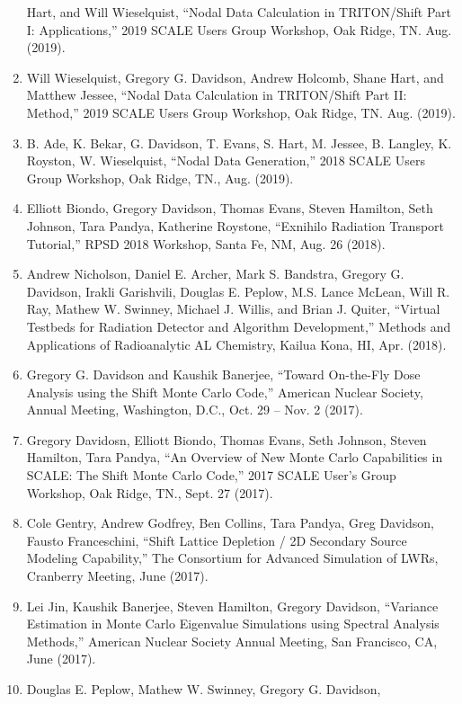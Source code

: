 \documentclass[letterpaper,11pt]{article}
\begin{document}
\begin{enumerate}
    Hart, and Will Wieselquist, ``Nodal Data Calculation in
    TRITON/Shift Part I: Applications,'' 2019 SCALE Users Group
    Workshop, Oak Ridge, TN. Aug. (2019).
  \item Will Wieselquist, Gregory G. Davidson, Andrew Holcomb, Shane
    Hart, and Matthew Jessee, ``Nodal Data Calculation in
    TRITON/Shift Part II: Method,'' 2019 SCALE Users Group Workshop,
    Oak Ridge, TN. Aug. (2019).
  \item B. Ade, K. Bekar, G. Davidson, T. Evans, S. Hart, M. Jessee,
    B. Langley, K. Royston, W. Wieselquist, ``Nodal Data
    Generation,'' 2018 SCALE Users Group Workshop, Oak Ridge, TN.,
    Aug. (2019).
  \item Elliott Biondo, Gregory Davidson, Thomas Evans, Steven
    Hamilton, Seth Johnson, Tara Pandya, Katherine Roystone,
    ``Exnihilo Radiation Transport Tutorial,'' RPSD 2018 Workshop,
    Santa Fe, NM, Aug. 26 (2018).
  \item Andrew Nicholson, Daniel E. Archer, Mark S. Bandstra,
    Gregory G. Davidson, Irakli Garishvili, Douglas E. Peplow,
    M.S. Lance McLean, Will R. Ray, Mathew W. Swinney, Michael
    J. Willis, and Brian J. Quiter, ``Virtual Testbeds for Radiation
    Detector and Algorithm Development,'' Methods and Applications
    of Radioanalytic AL Chemistry, Kailua Kona, HI, Apr. (2018).
  \item Gregory G. Davidson and Kaushik Banerjee, ``Toward
    On-the-Fly Dose Analysis using the Shift Monte Carlo Code,''
    American Nuclear Society, Annual Meeting, Washington, D.C.,
    Oct. 29 -- Nov. 2 (2017).
  \item Gregory Davidosn, Elliott Biondo, Thomas Evans, Seth
    Johnson, Steven Hamilton, Tara Pandya, ``An Overview of New
    Monte Carlo Capabilities in SCALE: The Shift Monte Carlo Code,''
    2017 SCALE User's Group Workshop, Oak Ridge, TN., Sept. 27 (2017).
  \item Cole Gentry, Andrew Godfrey, Ben Collins, Tara Pandya, Greg
    Davidson, Fausto Franceschini, ``Shift Lattice Depletion / 2D
    Secondary Source Modeling Capability,'' The Consortium for
    Advanced Simulation of LWRs, Cranberry Meeting, June (2017).
  \item Lei Jin, Kaushik Banerjee, Steven Hamilton, Gregory
    Davidson, ``Variance Estimation in Monte Carlo Eigenvalue
    Simulations using Spectral Analysis Methods,'' American Nuclear
    Society Annual Meeting, San Francisco, CA, June (2017).
  \item Douglas E. Peplow, Mathew W. Swinney, Gregory G. Davidson,

\end{enumerate}
\end{document}
